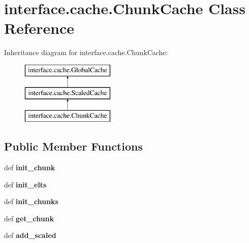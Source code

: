 \hypertarget{classinterface_1_1cache_1_1_chunk_cache}{\section{interface.\-cache.\-Chunk\-Cache \-Class \-Reference}
\label{classinterface_1_1cache_1_1_chunk_cache}
}
\-Inheritance diagram for interface.\-cache.\-Chunk\-Cache\-:\begin{figure}[H]
\begin{center}
\leavevmode
\includegraphics[height=3.000000cm]{classinterface_1_1cache_1_1_chunk_cache}
\end{center}
\end{figure}
\subsection*{\-Public \-Member \-Functions}
\begin{DoxyCompactItemize}
\item 
\hypertarget{classinterface_1_1cache_1_1_chunk_cache_a5ac68eaf44d3cac99bf98abfd39f687f}{def {\bfseries init\-\_\-chunk}}\label{classinterface_1_1cache_1_1_chunk_cache_a5ac68eaf44d3cac99bf98abfd39f687f}

\item 
\hypertarget{classinterface_1_1cache_1_1_chunk_cache_a7e1654f10929d2926638394c5ed1ebe4}{def {\bfseries init\-\_\-elts}}\label{classinterface_1_1cache_1_1_chunk_cache_a7e1654f10929d2926638394c5ed1ebe4}

\item 
\hypertarget{classinterface_1_1cache_1_1_chunk_cache_a7cc0a8f2a46b4cd1077d9f80d7c630d3}{def {\bfseries init\-\_\-chunks}}\label{classinterface_1_1cache_1_1_chunk_cache_a7cc0a8f2a46b4cd1077d9f80d7c630d3}

\item 
\hypertarget{classinterface_1_1cache_1_1_chunk_cache_af0c5eef3be5ec6bae095364e0abad836}{def {\bfseries get\-\_\-chunk}}\label{classinterface_1_1cache_1_1_chunk_cache_af0c5eef3be5ec6bae095364e0abad836}

\item 
\hypertarget{classinterface_1_1cache_1_1_chunk_cache_afa0d658ec0cfa2cc39cad48f265bdbe3}{def {\bfseries add\-\_\-scaled}}\label{classinterface_1_1cache_1_1_chunk_cache_afa0d658ec0cfa2cc39cad48f265bdbe3}

\end{DoxyCompactItemize}

